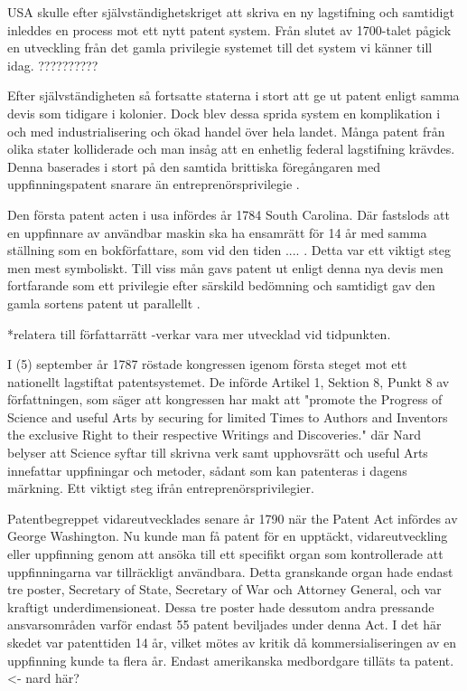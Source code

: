 USA skulle efter självständighetskriget att skriva en ny lagstifning och samtidigt inleddes en process
mot ett nytt patent system. Från slutet av 1700-talet pågick en utveckling från det gamla privilegie
systemet till det system vi känner till idag. ??????????

Efter självständigheten så fortsatte staterna i stort att ge ut patent enligt samma devis som tidigare i
kolonier. Dock blev dessa sprida system en komplikation i och med industrialisering och ökad handel över
hela landet. Många patent från olika stater kolliderade och man insåg att en enhetlig federal
lagstifning krävdes. Denna baserades i stort på den samtida brittiska föregångaren med uppfinningspatent
snarare än entreprenörsprivilegie \cite{nard}.

Den första patent acten i usa infördes år 1784 South Carolina. Där fastslods att en uppfinnare av
användbar maskin ska ha ensamrätt för 14 år med samma ställning som en bokförfattare, som vid den tiden
.... \cite{bracha}. Detta var ett viktigt steg men mest symboliskt. Till viss mån gavs patent ut enligt
denna nya devis men fortfarande som ett privilegie efter särskild bedömning och samtidigt gav den gamla
sortens patent ut parallellt \cite{bracha}.

*relatera till författarrätt -verkar vara mer utvecklad vid tidpunkten.

I (5) september år 1787 röstade kongressen igenom första steget mot ett nationellt lagstiftat
patentsystemet. De införde Artikel 1, Sektion 8, Punkt 8 av författningen, som säger att kongressen har
makt att "promote the Progress of Science and useful Arts by securing for limited Times to Authors and
Inventors the exclusive Right to their respective Writings and Discoveries." där Nard belyser att
Science syftar till skrivna verk samt upphovsrätt och useful Arts innefattar uppfiningar och metoder,
sådant som kan patenteras i dagens märkning\cite{nard}. Ett viktigt steg ifrån entreprenörsprivilegier.

Patentbegreppet vidareutvecklades senare år 1790 när the Patent Act infördes av George Washington. Nu
kunde man få patent för en upptäckt, vidareutveckling eller uppfinning genom att ansöka till ett
specifikt organ som kontrollerade att uppfinningarna var tillräckligt användbara\cite{nard}. Detta
granskande organ hade endast tre poster, Secretary of State, Secretary of War och Attorney General, och
var kraftigt underdimensioneat. Dessa tre poster hade dessutom andra pressande ansvarsområden varför
endast 55 patent beviljades under denna Act\cite{nard}. I det här skedet var patenttiden 14 år, vilket
mötes av kritik då kommersialiseringen av en uppfinning kunde ta flera år. Endast amerikanska
medbordgare tilläts ta patent\cite{nard}. <- nard här?

